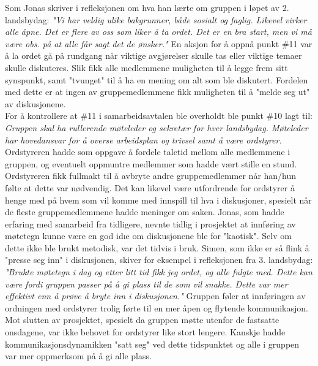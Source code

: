 Som Jonas skriver i refleksjonen om hva han lærte om gruppen i løpet av 2. landsbydag:
\textit{"Vi har veldig ulike bakgrunner, både sosialt og faglig. Likevel virker alle åpne. Det er flere av oss som liker å ta ordet. Det er en bra start, men vi må være obs. på at alle får sagt det de ønsker."}
En aksjon for å oppnå punkt \#11 var å la ordet gå på rundgang når viktige avgjørelser skulle tas eller viktige temaer skulle diskuteres.
Slik fikk alle medlemmene muligheten til å legge frem sitt synspunkt, samt "tvunget" til å ha en mening om alt som ble diskutert.
Fordelen med dette er at ingen av gruppemedlemmene fikk muligheten til å "melde seg ut" av diskusjonene.
\\
For å kontrollere at \#11 i samarbeidsavtalen ble overholdt ble punkt \#10 lagt til: \textit{Gruppen skal ha rullerende møteleder og sekretær for hver landsbydag. Møteleder har hovedansvar for å overse arbeidsplan og trivsel samt å være ordstyrer.}
Ordstyreren hadde som oppgave å fordele taletid mellom alle medlemmene i gruppen, og eventuelt oppmuntre medlemmer som hadde vært stille en stund.
Ordstyreren fikk fullmakt til å avbryte andre gruppemedlemmer når han/hun følte at dette var nødvendig.
Det kan likevel være utfordrende for ordstyrer å henge med på hvem som vil komme med innspill til hva i diskusjoner, spesielt når de fleste gruppemedlemmene hadde meninger om saken.
Jonas, som hadde erfaring med samarbeid fra tidligere, nevnte tidlig i prosjektet at innføring av møtetegn kunne være en god id\i{e} om diskusjonene ble for "kaotisk".
Selv om dette ikke ble brukt metodisk, var det tidvis i bruk.
Simen, som ikke er så flink å "presse seg inn" i diskusjonen, skiver for eksempel i refleksjonen fra 3. landsbydag: \textit{"Brukte møtetegn i dag og etter litt tid fikk jeg ordet, og alle fulgte med. Dette kan være fordi gruppen passer på å gi plass til de som vil snakke. Dette var mer effektivt enn å prøve å bryte inn i diskusjonen."}
Gruppen føler at innføringen av ordningen med ordstyrer trolig førte til en mer åpen og flytende kommunikasjon.
Mot slutten av prosjektet, spesielt da gruppen møtte utenfor de fastsatte onsdagene, var ikke behovet for ordstyrer like stort lengere.
Kanskje hadde kommunikasjonsdynamikken "satt seg" ved dette tidspunktet og alle i gruppen var mer oppmerksom på å gi alle plass.
\\

